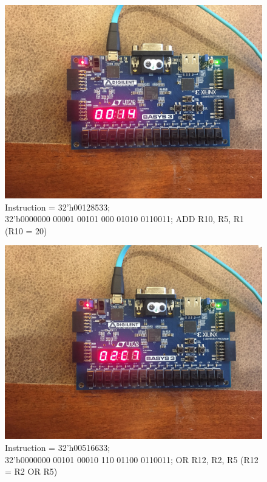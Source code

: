 \documentclass{article}
\begin{document}
\begin{figure}[htp]
    \centering
    \includegraphics[width=\textwidth, keepaspectratio]{addi_r2,r1,05.JPG}
    \centering
    \caption{Instruction = 32'h00128533; \\32’b0000000 00001 00101 000 01010 0110011; ADD R10, R5, R1 (R10 = 20)}
    \label{fig:my_label}
\end{figure}
\begin{figure}[htp]
    \centering
    \includegraphics[width=\textwidth, keepaspectratio]{or_r12.JPG}
    \centering
    \caption{Instruction = 32'h00516633; \\32’b0000000 00101 00010 110 01100 0110011;   OR R12, R2, R5 (R12 = R2 OR R5)}
    \label{fig:my_label}
\end{figure}
\end{document}
